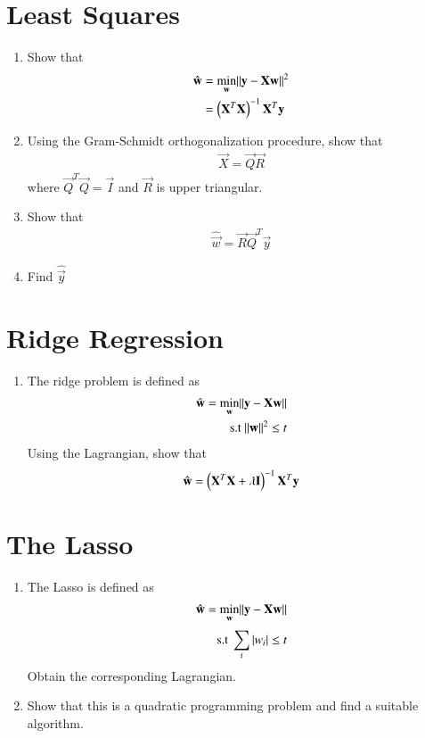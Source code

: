 \documentclass[journal,12pt,twocolumn]{IEEEtran}
\renewcommand\thesection{\arabic{section}}
\begin{document}
\section{Least Squares}
\begin{enumerate}[label=\thesection.\arabic*
,ref=\thesection.\theenumi]
\item Show that 
\begin{align}
\hat{\mathbf{w}} &= \min_{\mathbf{w}}\lVert\mathbf{y}-\mathbf{X}\mathbf{w}\rVert^2
\\
 &= \left(\mathbf{X}^T\mathbf{X}\right)^{-1}\mathbf{X}^T \mathbf{y}
\end{align}
\item  Using the Gram-Schmidt orthogonalization procedure, show that 
\begin{align}
\vec{X} = \vec{Q}\vec{R}
\end{align}
%
where $\vec{Q}^T\vec{Q} = \vec{I}$ and $\vec{R}$ is upper triangular.
\item Show that  
\begin{align}
\hat{\vec{w}} =\vec{R} \vec{Q}^T \vec{y}
\end{align}
%
\item Find $ \hat{\vec{y}}$

\end{enumerate}
%

%
\section{Ridge Regression}
\begin{enumerate}[label=\thesection.\arabic*
,ref=\thesection.\theenumi]
\item The ridge problem is defined as
\begin{align}
\hat{\mathbf{w}} = \min_{\mathbf{w}}\lVert\mathbf{y}-\mathbf{X}\mathbf{w}\rVert
\\
\text{s.t } \lVert\mathbf{w}\rVert^2 \le t
\end{align}
Using the Lagrangian, show that
\begin{align}
\hat{\mathbf{w}} = \left(\mathbf{X}^T\mathbf{X}+\lambda \mathbf{I}\right)^{-1}\mathbf{X}^T\mathbf{y}
\end{align}
\end{enumerate}
\section{The Lasso}
\begin{enumerate}[label=\thesection.\arabic*
,ref=\thesection.\theenumi]
\item The Lasso is defined as
\begin{align}
\hat{\mathbf{w}} = \min_{\mathbf{w}}\lVert\mathbf{y}-\mathbf{X}\mathbf{w}\rVert
\\
\text{s.t } \sum_{i}^{}\left\vert w_i\right\vert \le t
\end{align}
Obtain the corresponding Lagrangian.
\item Show that this is a quadratic programming problem and find a suitable algorithm.
\end{enumerate}
\end{document}
